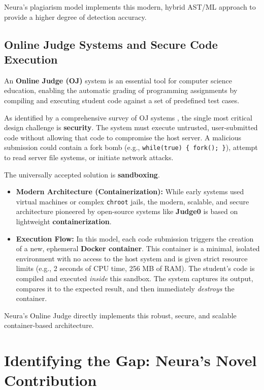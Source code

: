 Neura's plagiarism model implements this modern, hybrid AST/ML approach to provide a higher degree of detection accuracy.

\subsection{Online Judge Systems and Secure Code Execution}

An \textbf{Online Judge (OJ)} system is an essential tool for computer science education, enabling the automatic grading of programming assignments by compiling and executing student code against a set of predefined test cases.\cite{oj_intro}

As identified by a comprehensive survey of OJ systems \cite{oj_survey}, the single most critical design challenge is \textbf{security}.\cite{oj_survey} The system must execute untrusted, user-submitted code without allowing that code to compromise the host server. A malicious submission could contain a fork bomb (e.g., \verb|while(true) { fork(); }|), attempt to read server file systems, or initiate network attacks.

The universally accepted solution is \textbf{sandboxing}.\cite{oj_security}
\begin{itemize}
    \item \textbf{Modern Architecture (Containerization):} While early systems used virtual machines or complex \texttt{chroot} jails, the modern, scalable, and secure architecture pioneered by open-source systems like \textbf{Judge0} \cite{judge0_1, judge0_2, judge0_3} is based on lightweight \textbf{containerization}.\cite{docker1, docker2}
    \item \textbf{Execution Flow:} In this model, each code submission triggers the creation of a new, ephemeral \textbf{Docker container}.\cite{docker2, docker3} This container is a minimal, isolated environment with no access to the host system and is given strict resource limits (e.g., 2 seconds of CPU time, 256 MB of RAM).\cite{judge0_1} The student's code is compiled and executed \textit{inside} this sandbox.\cite{oj_security} The system captures its output, compares it to the expected result, and then immediately \textit{destroys} the container.
\end{itemize}

Neura's Online Judge directly implements this robust, secure, and scalable container-based architecture.

\section{Identifying the Gap: Neura's Novel Contribution}

